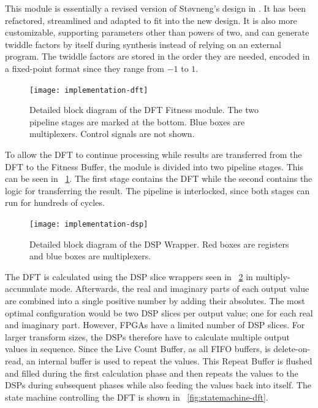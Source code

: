 This module is essentially a revised version of Støvneng's design in \cite{stovneng2014sblock}.
It has been refactored, streamlined and adapted to fit into the new design.
It is also more customizable, supporting parameters other than powers of two, and can generate twiddle factors by itself during synthesis instead of relying on an external program.
The twiddle factors are stored in the order they are needed, encoded in a fixed-point format since they range from $-1$ to $1$.

\begin{figure}[!ht]
    \centering
    \texttt{[image: implementation-dft]}
    \caption[DFT Fitness]{
        Detailed block diagram of the DFT Fitness module.
        The two pipeline stages are marked at the bottom.
        Blue boxes are multiplexers.
        Control signals are not shown.
    }
    \label{fig:implementation-dft}
\end{figure}

To allow the DFT to continue processing while results are transferred from the DFT to the Fitness Buffer, the module is divided into two pipeline stages.
This can be seen in \figurename~\ref{fig:implementation-dft}.
The first stage contains the DFT while the second contains the logic for transferring the result.
The pipeline is interlocked, since both stages can run for hundreds of cycles.

\begin{figure}[!ht]
    \hspace{-1\block}
    \texttt{[image: implementation-dsp]}
    \caption[DSP Wrapper]{
        Detailed block diagram of the DSP Wrapper.
        Red boxes are registers and blue boxes are multiplexers.
    }
    \label{fig:implementation-dsp}
\end{figure}

The DFT is calculated using the DSP slice wrappers seen in \figurename~\ref{fig:implementation-dsp} in multiply-accumulate mode.
Afterwards, the real and imaginary parts of each output value are combined into a single positive number by adding their absolutes.
The most optimal configuration would be two DSP slices per output value; one for each real and imaginary part.
However, FPGAs have a limited number of DSP slices.
For larger transform sizes, the DSPs therefore have to calculate multiple output values in sequence.
Since the Live Count Buffer, as all FIFO buffers, is delete-on-read, an internal buffer is used to repeat the values.
This Repeat Buffer is flushed and filled during the first calculation phase and then repeats the values to the DSPs during subsequent phases while also feeding the values back into itself.
The state machine controlling the DFT is shown in \figurename~\ref{fig:statemachine-dft}.

